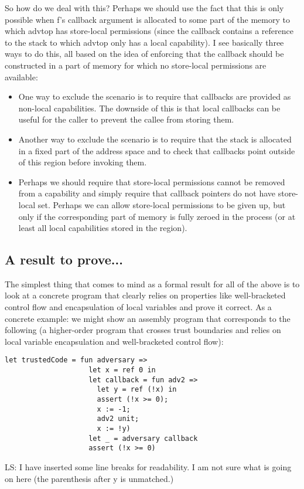 \documentclass{article}
\newcommand\lau[1]{{\color{purple} \sf \footnotesize {LS: #1}}\\}
\begin{document}
So how do we deal with this? Perhaps we should use the fact that this is only
possible when f's callback argument is allocated to some part of the memory to
which advtop has store-local permissions (since the callback contains a
reference to the stack to which advtop only has a local capability). I see
basically three ways to do this, all based on the idea of enforcing that the
callback should be constructed in a part of memory for which no store-local
permissions are available:
\begin{itemize}
\item One way to exclude the scenario is to require that callbacks are provided
  as non-local capabilities. The downside of this is that local callbacks can be
  useful for the caller to prevent the callee from storing them.
\item Another way to exclude the scenario is to require that the stack is
  allocated in a fixed part of the address space and to check that callbacks
  point outside of this region before invoking them.
\item Perhaps we should require that store-local permissions cannot be removed
  from a capability and simply require that callback pointers do not have
  store-local set. Perhaps we can allow store-local permissions to be given up,
  but only if the corresponding part of memory is fully zeroed in the process
  (or at least all local capabilities stored in the region).
\end{itemize}

\subsection{A result to prove...}
\label{sec:os-less-stack-property}

The simplest thing that comes to mind as a formal result for all of the above is
to look at a concrete program that clearly relies on properties like
well-bracketed control flow and encapsulation of local variables and prove it
correct. As a concrete example: we might show an assembly program that
corresponds to the following (a higher-order program that crosses trust
boundaries and relies on local variable encapsulation and well-bracketed control
flow):
\begin{verbatim}
let trustedCode = fun adversary =>
                    let x = ref 0 in
                    let callback = fun adv2 => 
                      let y = ref (!x) in 
                      assert (!x >= 0); 
                      x := -1; 
                      adv2 unit; 
                      x := !y)
                    let _ = adversary callback
                    assert (!x >= 0)
\end{verbatim}
\lau{I have inserted some line breaks for readability. I am not sure what is going on here (the parenthesis after y is unmatched.)}
\end{document}
